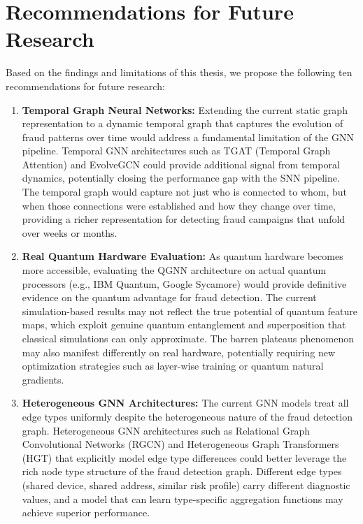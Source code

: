 \section{Recommendations for Future Research}

Based on the findings and limitations of this thesis, we propose the following ten recommendations for future research:

\begin{enumerate}[label=\arabic*.]
\item \textbf{Temporal Graph Neural Networks:} Extending the current static graph representation to a dynamic temporal graph that captures the evolution of fraud patterns over time would address a fundamental limitation of the GNN pipeline. Temporal GNN architectures such as TGAT (Temporal Graph Attention) and EvolveGCN could provide additional signal from temporal dynamics, potentially closing the performance gap with the SNN pipeline. The temporal graph would capture not just who is connected to whom, but when those connections were established and how they change over time, providing a richer representation for detecting fraud campaigns that unfold over weeks or months.

\item \textbf{Real Quantum Hardware Evaluation:} As quantum hardware becomes more accessible, evaluating the QGNN architecture on actual quantum processors (e.g., IBM Quantum, Google Sycamore) would provide definitive evidence on the quantum advantage for fraud detection. The current simulation-based results may not reflect the true potential of quantum feature maps, which exploit genuine quantum entanglement and superposition that classical simulations can only approximate. The barren plateaus phenomenon may also manifest differently on real hardware, potentially requiring new optimization strategies such as layer-wise training or quantum natural gradients.

\item \textbf{Heterogeneous GNN Architectures:} The current GNN models treat all edge types uniformly despite the heterogeneous nature of the fraud detection graph. Heterogeneous GNN architectures such as Relational Graph Convolutional Networks (RGCN) and Heterogeneous Graph Transformers (HGT) that explicitly model edge type differences could better leverage the rich node type structure of the fraud detection graph. Different edge types (shared device, shared address, similar risk profile) carry different diagnostic values, and a model that can learn type-specific aggregation functions may achieve superior performance.


\end{enumerate}
